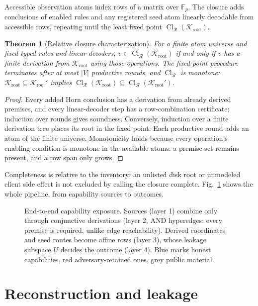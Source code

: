 \documentclass[pdflatex,sn-mathphys-num,twocolumn]{sn-jnl}
\theoremstyle{plain}
\newtheorem{theorem}{Theorem}
\theoremstyle{definition}
\newcommand{\Cl}{\operatorname{Cl}}
\newcommand{\F}{\mathbb{F}}
\begin{document}
Accessible observation atoms index rows of a matrix over $\F_p$. The closure adds conclusions of enabled rules and any registered seed atom linearly decodable from accessible rows, repeating until the least fixed point $\Cl_{\mathcal R}(\mathcal K_{\mathrm{root}})$.

\begin{theorem}[Relative closure characterization]\label{thm:closure}
For a finite atom universe and fixed typed rules and linear decoders, $v\in\Cl_{\mathcal R}(\mathcal K_{\mathrm{root}})$ if and only if $v$ has a finite derivation from $\mathcal K_{\mathrm{root}}$ using those operations. The fixed-point procedure terminates after at most $|V|$ productive rounds, and $\Cl_{\mathcal R}$ is monotone: $\mathcal K_{\mathrm{root}}\subseteq \mathcal K_{\mathrm{root}}'$ implies $\Cl_{\mathcal R}(\mathcal K_{\mathrm{root}})\subseteq\Cl_{\mathcal R}(\mathcal K_{\mathrm{root}}')$.
\end{theorem}
\begin{proof}
Every added Horn conclusion has a derivation from already derived premises, and every linear-decoder step has a row-combination certificate; induction over rounds gives soundness. Conversely, induction over a finite derivation tree places its root in the fixed point. Each productive round adds an atom of the finite universe. Monotonicity holds because every operation's enabling condition is monotone in the available atoms: a premise set remains present, and a row span only grows.
\end{proof}

Completeness is relative to the inventory: an unlisted disk root or unmodeled client side effect is not excluded by calling the closure complete. Fig.~\ref{fig:capabilities} shows the whole pipeline, from capability sources to outcomes.

\begin{figure}[t]
\centering
\resizebox{\linewidth}{!}{}
\caption{End-to-end capability exposure. Sources (layer 1) combine only through conjunctive derivations (layer 2, AND hyperedges: every premise is required, unlike edge reachability). Derived coordinates and seed routes become affine rows (layer 3), whose leakage subspace $U$ decides the outcome (layer 4). Blue marks honest capabilities, red adversary-retained ones, grey public material.}\label{fig:capabilities}
\end{figure}


\section{Reconstruction and leakage}\label{sec:leakage}
\end{document}

